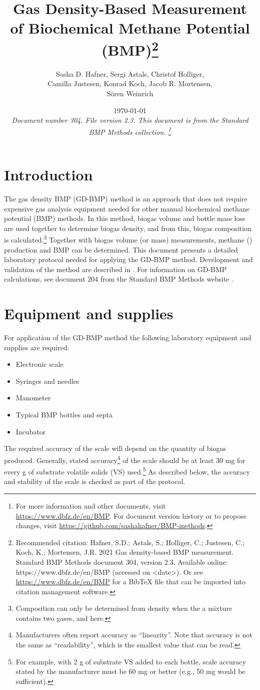 \documentclass[]{article}
\title {Gas Density-Based Measurement of Biochemical Methane Potential (BMP)\footnote{
  Recommended citation: 
Hafner, S.D.; Astals, S.; Holliger, C.; Justesen, C.; Koch, K.; Mortensen, J.R. 2021 Gas density-based BMP measurement. Standard BMP Methods document 304, version 2.3. Available online: https://www.dbfz.de/en/BMP (accessed on <date>).
\newline
  Or see \url{https://www.dbfz.de/en/BMP} for a BibTeX file that can be imported into citation management software.
}
}
\author{Sasha D. Hafner, Sergi Astals, Christof Holliger, \\ Camilla Justesen, Konrad Koch, Jacob R. Mortensen, \\ S\"oren Weinrich}
\date{\today \\
\bigskip
\textit{
  Document number 304.
  File version 2.3. 
  This document is from the Standard BMP Methods collection.
    \footnote{For more information and other documents, visit \url{https://www.dbfz.de/en/BMP}. 
    For document version history or to propose changes, visit \url{https://github.com/sashahafner/BMP-methods}.}
}
}
\begin{document}
\maketitle

\section{Introduction}
The gas density BMP (GD-BMP) method is an approach that does not require expensive gas analysis equipment needed for other manual biochemical methane potential (BMP) methods.
In this method, biogas volume and bottle mass loss are used together to determine biogas density, and from this, biogas composition is calculated.\footnote{Composition can only be determined from density when the a mixture contains two gases,  and  here.}
Together with biogas volume (or mass) measurements, methane () production and BMP can be determined.
This document presents a detailed laboratory protocol needed for applying the GD-BMP method.
Development and validation of the method are described in \citet{justesenDevelopmentValidationLowcost2019}.
For information on GD-BMP calculations, see document 204 from the Standard BMP Methods website \citep{BMPdoc204gasdens}. 

\section{Equipment and supplies}
\label{sec:equipment}
For application of the GD-BMP method the following laboratory equipment and supplies are required:
\begin{itemize}
    \item Electronic scale
    \item Syringes and needles
    \item Manometer
    \item Typical BMP bottles and septa
    \item Incubator
\end{itemize}

The required accuracy of the scale will depend on the quantity of biogas produced. 
Generally, stated accuracy\footnote{
  Manufacturers often report accuracy as ``linearity''. 
  Note that accuracy is not the same as ``readability'', which is the smallest value that can be read. 
} of the scale should be at least 30 mg for every g of substrate volatile solids (VS) used.\footnote{
  For example, with 2 g of substrate VS added to each bottle, scale accuracy stated by the manufacturer must be 60 mg or better (e.g., 50 mg would be sufficient).
}
As described below, the accuracy and stability of the scale is checked as part of the protocol.
\end{document}
